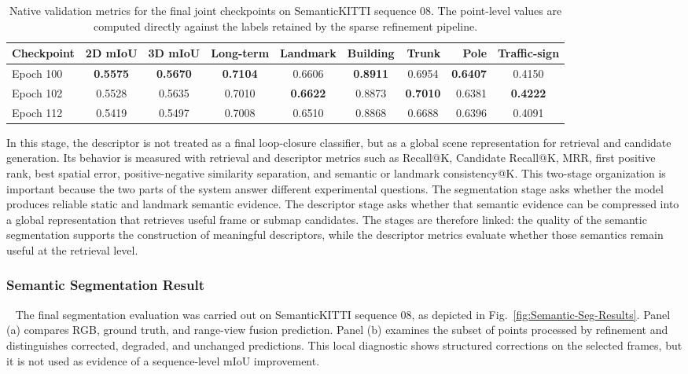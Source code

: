 \begin{table}[t]
\centering
\caption{Native validation metrics for the final joint checkpoints on
SemanticKITTI sequence 08. The point-level values are computed directly
against the labels retained by the sparse refinement pipeline.}
\label{tab:semantic-segmentation-results}
\small
\begin{tabular}{lccccccrc}
\hline
Checkpoint & \multicolumn{1}{r}{2D mIoU} & \multicolumn{1}{r}{3D mIoU} & \multicolumn{1}{r}{Long-term} & \multicolumn{1}{r}{Landmark} & \multicolumn{1}{r}{Building} & \multicolumn{1}{r}{Trunk} & Pole & \multicolumn{1}{r}{Traffic-sign} \\ \hline
Epoch 100 & \textbf{0.5575} & \textbf{0.5670} & \textbf{0.7104} & 0.6606 & \textbf{0.8911} & 0.6954 & \textbf{0.6407} & 0.4150 \\
Epoch 102 & 0.5528 & 0.5635 & 0.7010 & \textbf{0.6622} & 0.8873 & \textbf{0.7010} & 0.6381 & \textbf{0.4222} \\
Epoch 112 & 0.5419 & 0.5497 & 0.7008 & 0.6510 & 0.8868 & 0.6688 & 0.6396 & 0.4091 \\ \hline
\end{tabular}
\end{table}

In this stage, the descriptor is not treated as a final loop-closure classifier, but as a global scene representation for retrieval and candidate generation. Its behavior is measured with retrieval and descriptor metrics such as Recall@K, Candidate Recall@K, MRR, first positive rank, best spatial error, positive-negative similarity separation, and semantic or landmark consistency@K.
This two-stage organization is important because the two parts of the system answer different experimental questions. The segmentation stage asks whether the model produces reliable static and landmark semantic evidence. 
The descriptor stage asks whether that semantic evidence can be compressed into a global representation that retrieves useful frame or submap candidates.
The stages are therefore linked: the quality of the semantic segmentation supports the construction of meaningful descriptors, while the descriptor metrics evaluate whether those semantics remain useful at the retrieval level.

\subsubsection{Semantic Segmentation Result}~\label{subsubsec:semantic-segmentation-result}
The final segmentation evaluation was carried out on SemanticKITTI sequence 08, as depicted in Fig.~\ref{fig:Semantic-Seg-Results}. Panel (a) compares RGB, ground truth, and range-view fusion prediction. Panel (b) examines the subset of points processed by refinement and distinguishes corrected, degraded, and unchanged predictions. This local diagnostic shows structured corrections on the selected frames, but it is not used as evidence of a sequence-level mIoU improvement.

